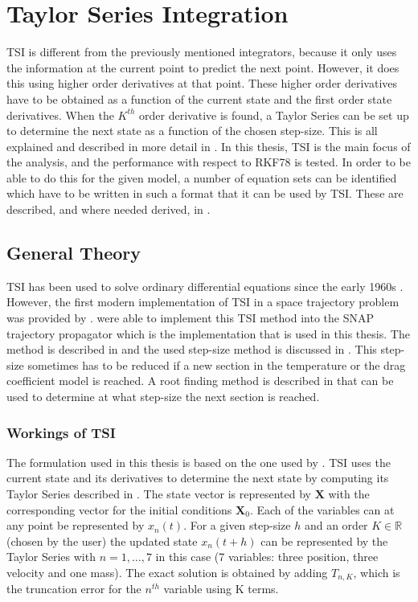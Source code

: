 \chapter{Taylor Series Integration} %
\label{ch:tsi}
\acf{TSI} is different from the previously mentioned integrators, because it only uses the information at the current point to predict the next point. However, it does this using higher order derivatives at that point. These higher order derivatives have to be obtained as a function of the current state and the first order state derivatives. When the $K^{th}$ order derivative is found, a Taylor Series can be set up to determine the next state as a function of the chosen step-size. This is all explained and described in more detail in . In this thesis, \ac{TSI} is the main focus of the analysis, and the performance with respect to \ac{RKF78} is tested. In order to be able to do this for the given model, a number of equation sets can be identified which have to be written in such a format that it can be used by \ac{TSI}. These are described, and where needed derived, in .

\section{General Theory}
\label{sec:genTsiTheory}
\ac{TSI} has been used to solve ordinary differential equations since the early 1960s \citep{scott2008high}. However, the first modern implementation of \ac{TSI} in a space trajectory problem was provided by \cite{montenbruck1992numerical}. \cite{scott2008high} were able to implement this \ac{TSI} method into the SNAP trajectory propagator which is the implementation that is used in this thesis. The method is described in  and the used step-size method is discussed in . This step-size sometimes has to be reduced if a new section in the temperature or the drag coefficient model is reached. A root finding method is described in  that can be used to determine at what step-size the next section is reached.



\subsection{Workings of \ac{TSI}}
\label{subsec:workTsi}
The formulation used in this thesis is based on the one used by \cite{scott2008high}. \ac{TSI} uses the current state and its derivatives to determine the next state by computing its Taylor Series described in . The state vector is represented by $\mathbf{X}$ with the corresponding vector for the initial conditions $\mathbf{X}_{0}$. Each of the variables can at any point be represented by $x_{n}\left(t\right)$. For a given step-size $h$ and an order $K \in \mathbb{R}$ (chosen by the user) the updated state $x_{n}\left(t+h\right)$ can be represented by the Taylor Series with $n=1,\dots,7$ in this case (7 variables: three position, three velocity and one mass). The exact solution is obtained by adding $T_{n,K}$, which is the truncation error for the $n^{th}$ variable using K terms. 

